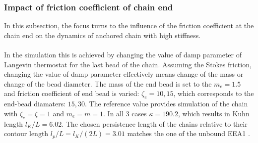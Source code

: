 \documentclass[
    paper=A4,pagesize=automedia,fontsize=12pt,
    BCOR=15mm,DIV=22,
    twoside,headinclude,footinclude=false,
    fleqn,             %
    bibliography=totocnumbered,          %
    listof=totoc,                %
    listof=flat,                 %
    cleardoublepage=empty      %
    numbers=endperiod
]{scrartcl}
\begin{document}
\subsubsection{Impact of friction coefficient of chain end}
In this subsection, the focus turns to the influence 
of the friction coefficient at the chain end on the dynamics of anchored chain with high
stiffness.
\\
\\
In the simulation this is achieved by changing the value of damp parameter of Langevin thermostat
for the last bead of the chain. Assuming the Stokes friction, 
changing the value of damp parameter effectively means change of the mass or change of the 
bead diameter. The mass of the end bead is set to the $m_e = 1.5$ and friction coefficient of end bead
is varied: $\zeta_e = 10, 15$, which corresponds to the end-bead diamaters: $15, 30$.
The reference value provides simulation of the chain with $\zeta_e=\zeta=1$ and $m_e=m=1$.
In all 3 cases $\kappa=190.2$, which results in Kuhn length $l_K/L=6.02$. The chosen
persistence length of the chains relative to their contour length $l_p/L=l_K/(2L)=3.01$ matches
the one of the unbound EEA1 \cite{Singh:2022}.
\end{document}
